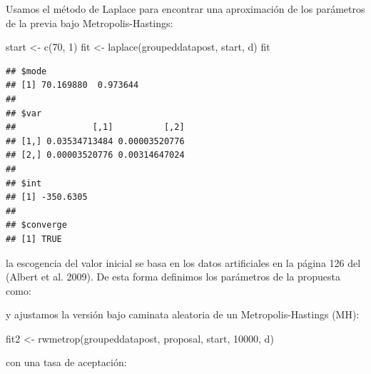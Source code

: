 \documentclass[
  12pt,
]{book}
\newenvironment{Shaded}{\begin{snugshade}}{\end{snugshade}}
\newcommand{\AttributeTok}[1]{\textcolor[rgb]{0.77,0.63,0.00}{#1}}
\newcommand{\DecValTok}[1]{\textcolor[rgb]{0.00,0.00,0.81}{#1}}
\newcommand{\FunctionTok}[1]{\textcolor[rgb]{0.00,0.00,0.00}{#1}}
\newcommand{\NormalTok}[1]{#1}
\newcommand{\OtherTok}[1]{\textcolor[rgb]{0.56,0.35,0.01}{#1}}
\newcommand{\SpecialCharTok}[1]{\textcolor[rgb]{0.00,0.00,0.00}{#1}}
\begin{document}
Usamos el método de Laplace para encontrar una aproximación de los
parámetros de la previa bajo Metropolis-Hastings:

\begin{Shaded}
\begin{Highlighting}[]
\NormalTok{start }\OtherTok{\textless{}{-}} \FunctionTok{c}\NormalTok{(}\DecValTok{70}\NormalTok{, }\DecValTok{1}\NormalTok{)}
\NormalTok{fit }\OtherTok{\textless{}{-}} \FunctionTok{laplace}\NormalTok{(groupeddatapost, start, d)}
\NormalTok{fit}
\end{Highlighting}
\end{Shaded}

\begin{verbatim}
## $mode
## [1] 70.169880  0.973644
## 
## $var
##               [,1]          [,2]
## [1,] 0.03534713484 0.00003520776
## [2,] 0.00003520776 0.00314647024
## 
## $int
## [1] -350.6305
## 
## $converge
## [1] TRUE
\end{verbatim}

la escogencia del valor inicial se basa en los datos artificiales en la
página 126 del (Albert et al. 2009). De esta forma definimos los
parámetros de la propuesta como:

\begin{Shaded}
\end{Shaded}

y ajustamos la versión bajo caminata aleatoria de un Metropolis-Hastings
(MH):

\begin{Shaded}
\begin{Highlighting}[]
\NormalTok{fit2 }\OtherTok{\textless{}{-}} \FunctionTok{rwmetrop}\NormalTok{(groupeddatapost, proposal, start,}
    \DecValTok{10000}\NormalTok{, d)}
\end{Highlighting}
\end{Shaded}

con una tasa de aceptación:

\begin{Shaded}
\end{Shaded}
\end{document}
